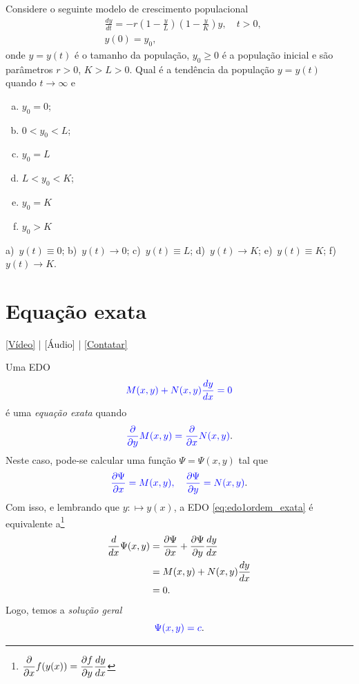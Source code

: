 \begin{exer}
  Considere o seguinte modelo de crescimento populacional
  \begin{align*}
    &\frac{dy}{dt} = -r\left(1 - \frac{y}{L}\right)\left(1 - \frac{y}{K}\right)y,\quad t>0,\\
    &y(0) = y_0,
  \end{align*}
  onde $y = y(t)$ é o tamanho da população, $y_0 \geq 0$ é a população inicial e são parâmetros $r > 0$, $K>L>0$. Qual é a tendência da população $y = y(t)$ quando $t\to\infty$ e
  \begin{enumerate}[a)]
  \item $y_0 = 0$;
  \item $0 < y_0 < L$;
  \item $y_0 = L$
  \item $L < y_0 < K$;
  \item $y_0 = K$
  \item $y_0 > K$
  \end{enumerate}
\end{exer}
\begin{resp}
  a)~$y(t) \equiv 0$; b)~$y(t)\to 0$; c)~$y(t)\equiv L$; d)~$y(t)\to K$; e)~$y(t)\equiv K$; f)~$y(t)\to K$.
\end{resp}

\section{Equação exata}\label{cap_edo1ordem_sec_eqexata}

\begin{flushright}
  \href{https://archive.org/details/edo-ordem-1-exata}{[Vídeo]} | [Áudio] | \href{https://phkonzen.github.io/notas/contato.html}{[Contatar]}
\end{flushright}

Uma EDO
\begin{equation}\label{eq:edo1ordem_exata}
  {\color{blue} M(x,y) + N(x,y)\frac{dy}{dx} = 0}
\end{equation}
é uma \emph{equação exata} quando
\begin{equation}
  {\color{blue} \frac{\partial}{\partial y}M(x,y) = \frac{\partial}{\partial x}N(x,y)}.
\end{equation}
Neste caso, pode-se calcular uma função $\Psi = \Psi(x,y)$ tal que
\begin{equation}
  {\color{blue}\frac{\partial\Psi}{\partial x} = M(x,y),\quad\frac{\partial\Psi}{\partial y} = N(x,y)}.
\end{equation}
Com isso, e lembrando que $y:\mapsto y(x)$, a EDO \eqref{eq:edo1ordem_exata} é equivalente a\footnote{$\displaystyle \frac{\partial}{\partial x}f(y(x)) = \frac{\partial f}{\partial y}\frac{d y}{dx}$}
\begin{align}
  \frac{d}{dx}\Psi(x,y) &= \frac{\partial\Psi}{\partial x} + \frac{\partial\Psi}{\partial y}\frac{dy}{dx} \\
  &= M(x,y) + N(x,y)\frac{dy}{dx} \\
  &= 0.
\end{align}
Logo, temos a \emph{solução geral}
\begin{equation}
  {\color{blue}\Psi(x,y) = c}.
\end{equation}


